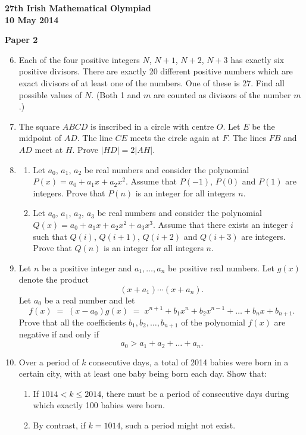 \documentclass[12pt]{article}
\begin{document}
\newpage
\begin{center}
{\large\bfseries 27th Irish Mathematical Olympiad\\10 May 2014}
\end{center}
\bigskip\noindent\textbf{Paper 2}\bigskip
\begin{enumerate}
\setcounter{enumi}{5}
\item Each of the four positive integers $N$, $N+1$, $N+2$, $N+3$ has exactly six positive divisors. There are exactly 20 different positive numbers which are exact divisors of at least one of the numbers. One of these is 27. Find all possible values of $N$. (Both 1 and $m$ are counted as divisors of the number $m$.)

\item The square $ABCD$ is inscribed in a circle with centre $O$. Let $E$ be the midpoint of $AD$. The line $CE$ meets the circle again at $F$. The lines $FB$ and $AD$ meet at $H$. Prove $|HD| = 2|AH|$.

\item \begin{enumerate}
\item[(a)] Let $a_0$, $a_1$, $a_2$ be real numbers and consider the polynomial $P(x) = a_0 + a_1 x + a_2 x^2$. Assume that $P(-1)$, $P(0)$ and $P(1)$ are integers. Prove that $P(n)$ is an integer for all integers $n$.
\item[(b)] Let $a_0$, $a_1$, $a_2$, $a_3$ be real numbers and consider the polynomial $Q(x) = a_0 + a_1 x + a_2 x^2 + a_3 x^3$. Assume that there exists an integer $i$ such that $Q(i)$, $Q(i+1)$, $Q(i+2)$ and $Q(i+3)$ are integers. Prove that $Q(n)$ is an integer for all integers $n$.
\end{enumerate}

\item Let $n$ be a positive integer and $a_1, \ldots, a_n$ be positive real numbers. Let $g(x)$ denote the product
\[
(x + a_1) \cdots (x + a_n).
\]
Let $a_0$ be a real number and let
\[
f(x) \;=\; (x - a_0)g(x) \;=\; x^{n+1} + b_1 x^n + b_2 x^{n-1} + \ldots + b_n x + b_{n+1}.
\]
Prove that all the coefficients $b_1, b_2, \ldots, b_{n+1}$ of the polynomial $f(x)$ are negative if and only if
\[
a_0 > a_1 + a_2 + \ldots + a_n.
\]

\item Over a period of $k$ consecutive days, a total of 2014 babies were born in a certain city, with at least one baby being born each day. Show that:
\begin{enumerate}
\item[(a)] If $1014 < k \leq 2014$, there must be a period of consecutive days during which exactly 100 babies were born.
\item[(b)] By contrast, if $k = 1014$, such a period might not exist.
\end{enumerate}
\end{enumerate}
\end{document}
